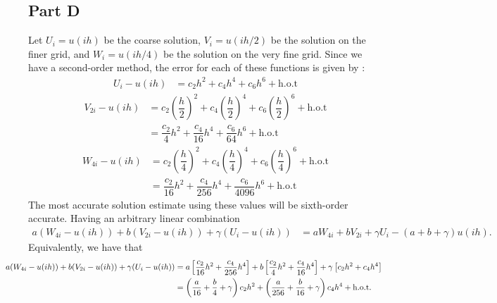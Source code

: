 \documentclass[12pt]{article}
\begin{document}
\subsection*{Part D}
Let $U_{i} = u(ih)$ be the coarse solution, $V_{i} = u(ih/2)$ be the solution on the finer grid, and $W_{i} = u(ih/4)$ be the solution on
the very fine grid. Since we have a second-order method, the error for each of these functions is given by :
\begin{align}
U_{i} - u(ih) &= c_{2}h^{2} + c_{4}h^{4} + c_{6}h^{6} + \mathrm{h.o.t}
\end{align}
\begin{subequations}
    \begin{align}
        V_{2i} - u(ih) &= c_{2}\left(\dfrac{h}{2}\right)^{2} + c_{4}\left(\dfrac{h}{2}\right)^{4} + c_{6}\left(\dfrac{h}{2}\right)^{6} + \mathrm{h.o.t}\\
        &= \dfrac{c_{2}}{4}h^{2} + \dfrac{c_{4}}{16}h^{4} + \dfrac{c_{6}}{64}h^{6} + \mathrm{h.o.t}
    \end{align}
\end{subequations}
\begin{subequations}
    \begin{align}
        W_{4i} - u(ih) &= c_{2}\left(\dfrac{h}{4}\right)^{2} + c_{4}\left(\dfrac{h}{4}\right)^{4} + c_{6}\left(\dfrac{h}{4}\right)^{6} + \mathrm{h.o.t}\\
        &= \dfrac{c_{2}}{16}h^{2} + \dfrac{c_{4}}{256}h^{4} + \dfrac{c_{6}}{4096}h^{6} + \mathrm{h.o.t}
    \end{align}
\end{subequations}
The most accurate solution estimate using these values will be sixth-order accurate. Having an arbitrary linear combination
\begin{align}
    a(W_{4i}-u(ih)) + b(V_{2i}-u(ih)) + \gamma(U_{i}-u(ih)) &= aW_{4i} + bV_{2i} + \gamma U_{i} - (a+b+\gamma)u(ih).
\end{align}
Equivalently, we have that
\begin{subequations}
    \begin{align}
        \hspace{-1cm} a(W_{4i}-u(ih)) + b(V_{2i}-u(ih)) + \gamma(U_{i}-u(ih)) &= a\left[\dfrac{c_{2}}{16}h^{2} + \dfrac{c_{4}}{256}h^{4}\right] + b\left[\dfrac{c_{2}}{4}h^{2} + \dfrac{c_{4}}{16}h^{4} \right] + \gamma\left[c_{2}h^{2} + c_{4}h^{4}\right]\\
        &= \left(\dfrac{a}{16}+\dfrac{b}{4}+\gamma\right)c_{2}h^{2}
        + \left(\dfrac{a}{256}+\dfrac{b}{16}+\gamma\right)c_{4}h^{4} + \mathrm{h.o.t}.
    \end{align}
\end{subequations}
\end{document}
